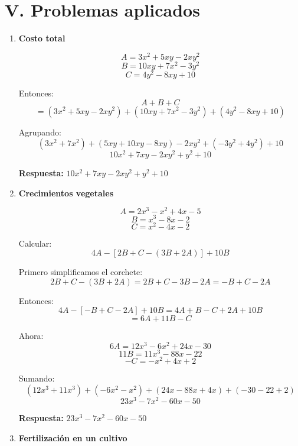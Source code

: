 \documentclass[12pt]{article}
\begin{document}
		\newpage
	
	\vspace*{1em}		
	
	
	\section*{V. Problemas aplicados}
	
	\begin{enumerate}[itemsep=0.7cm]
		
		\item \textbf{Costo total}
		
		\[
		A = 3x^2 + 5xy - 2xy^2
		\]
		\[
		B = 10xy + 7x^2 - 3y^2
		\]
		\[
		C = 4y^2 - 8xy + 10
		\]
		
		Entonces:
		\[
		A+B+C
		\]
		\[
		=(3x^2 + 5xy - 2xy^2) + (10xy + 7x^2 - 3y^2) + (4y^2 - 8xy + 10)
		\]
		
		Agrupando:
		\[
		(3x^2+7x^2) + (5xy+10xy-8xy) -2xy^2 + (-3y^2+4y^2) + 10
		\]
		\[
		10x^2 + 7xy - 2xy^2 + y^2 + 10
		\]
		
		\textbf{Respuesta:} \(\boxed{10x^2 + 7xy - 2xy^2 + y^2 + 10}\)
		
		\item \textbf{Crecimientos vegetales}
		
		\[
		A = 2x^3 - x^2 + 4x - 5
		\]
		\[
		B = x^3 - 8x - 2
		\]
		\[
		C = x^2 - 4x - 2
		\]
		
		Calcular:
		\[
		4A - [2B + C - (3B + 2A)] + 10B
		\]
		
		Primero simplificamos el corchete:
		\[
		2B + C - (3B + 2A)=2B+C-3B-2A = -B + C - 2A
		\]
		
		Entonces:
		\[
		4A -[-B + C - 2A] + 10B = 4A + B - C + 2A + 10B
		\]
		\[
		= 6A + 11B - C
		\]
		
		Ahora:
		\[
		6A = 12x^3 - 6x^2 + 24x - 30
		\]
		\[
		11B = 11x^3 - 88x - 22
		\]
		\[
		-C = -x^2 + 4x + 2
		\]
		
			\newpage
		
		\vspace*{1em}		
				
		Sumando:
		\[
		(12x^3+11x^3) + (-6x^2-x^2) + (24x-88x+4x) + (-30-22+2)
		\]
		\[
		23x^3 - 7x^2 - 60x - 50
		\]
		
		\textbf{Respuesta:} \(\boxed{23x^3 - 7x^2 - 60x - 50}\)
		
		\item \textbf{Fertilización en un cultivo}
		

\end{enumerate}
\end{document}
